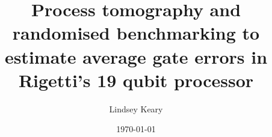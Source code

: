 \documentclass[
 a4paper,showpacs,aip,groupedaddress,%
  eqsecnum,notitlepage,showkeys,cha,longbibliography,10pt
]{revtex4-1}
\begin{document}
\title{\LARGE{Process tomography and randomised benchmarking to estimate average gate errors in Rigetti's 19 qubit processor}}

\author{Lindsey Keary}
\date{\today}

\begin{footnotesize}

\end{footnotesize}

\maketitle
\begin{footnotesize}




\end{footnotesize}



\tiny

\end{document}
